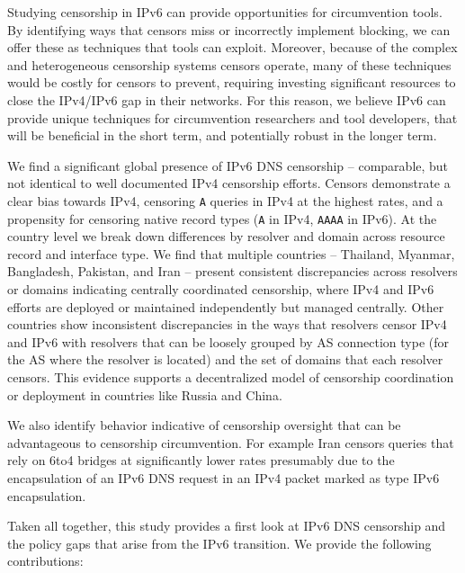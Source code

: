 Studying censorship in IPv6 can provide opportunities for circumvention tools.
By identifying ways that censors miss or incorrectly implement blocking, we can
offer these as techniques that tools can exploit. Moreover, because of the
complex and heterogeneous censorship systems censors operate, many of these
techniques would be costly for censors to prevent, requiring investing
significant resources to close the IPv4/IPv6 gap in their networks. For this
reason, we believe IPv6 can provide unique techniques for circumvention
researchers and tool developers, that will be beneficial in the short term, and
potentially robust in the longer term.

\medskip
We find a significant global presence of IPv6 DNS censorship -- comparable, but not
identical to well documented IPv4 censorship efforts. Censors demonstrate a
clear bias towards IPv4, censoring \texttt{A} queries in IPv4 at the highest rates,
and a propensity for censoring native record types (\texttt{A} in IPv4, \texttt{AAAA} in IPv6).
At the country level we break down differences by resolver and
domain across resource record and interface type. We find that multiple countries
-- Thailand, Myanmar, Bangladesh, Pakistan, and Iran --
present consistent discrepancies across resolvers or domains indicating
centrally coordinated censorship, where IPv4 and IPv6 efforts are deployed or
maintained independently but managed centrally. Other countries show inconsistent discrepancies in the
ways that resolvers censor IPv4 and IPv6 with resolvers that can be loosely grouped
by AS connection type (for the AS where the resolver is located) and the set of
domains that each resolver censors. This evidence supports a decentralized model
of censorship coordination or deployment in countries like Russia and China.

We also identify behavior indicative of censorship oversight that can be advantageous
to censorship circumvention. For example Iran censors queries that rely on 6to4
bridges at significantly lower rates presumably due to the encapsulation of an
IPv6 DNS request in an IPv4 packet marked as type IPv6 encapsulation.

Taken all together, this study provides a first look at IPv6 DNS censorship and
the policy gaps that arise from the IPv6 transition. We provide the following
contributions:


